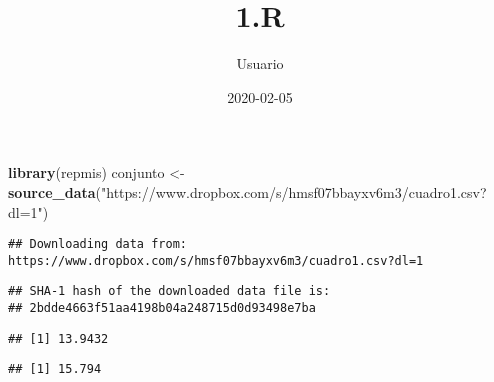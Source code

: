 \documentclass[
]{article}
\title{1.R}
\author{Usuario}
\date{2020-02-05}
\newenvironment{Shaded}{\begin{snugshade}}{\end{snugshade}}
\newcommand{\CommentTok}[1]{\textcolor[rgb]{0.56,0.35,0.01}{\textit{#1}}}
\newcommand{\KeywordTok}[1]{\textcolor[rgb]{0.13,0.29,0.53}{\textbf{#1}}}
\newcommand{\NormalTok}[1]{#1}
\newcommand{\OperatorTok}[1]{\textcolor[rgb]{0.81,0.36,0.00}{\textbf{#1}}}
\newcommand{\StringTok}[1]{\textcolor[rgb]{0.31,0.60,0.02}{#1}}
\begin{document}
\maketitle

\begin{Shaded}
\begin{Highlighting}[]
\KeywordTok{library}\NormalTok{(repmis)}
\NormalTok{conjunto <-}\StringTok{ }\KeywordTok{source_data}\NormalTok{(}\StringTok{"https://www.dropbox.com/s/hmsf07bbayxv6m3/cuadro1.csv?dl=1"}\NormalTok{)}
\end{Highlighting}
\end{Shaded}

\begin{verbatim}
## Downloading data from: https://www.dropbox.com/s/hmsf07bbayxv6m3/cuadro1.csv?dl=1
\end{verbatim}

\begin{verbatim}
## SHA-1 hash of the downloaded data file is:
## 2bdde4663f51aa4198b04a248715d0d93498e7ba
\end{verbatim}

\begin{Shaded}
\end{Shaded}

\begin{verbatim}
## [1] 13.9432
\end{verbatim}

\begin{Shaded}
\end{Shaded}

\begin{verbatim}
## [1] 15.794
\end{verbatim}

\begin{Shaded}
\end{Shaded}
\end{document}
